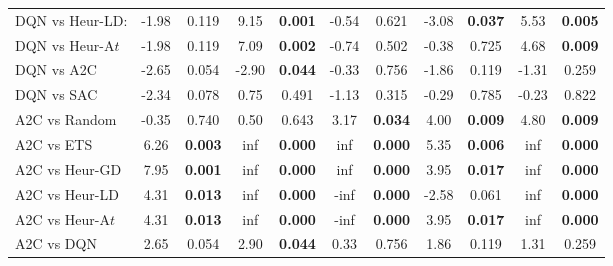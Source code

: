 \begin{tabular}{lcccccccccc}
	DQN vs Heur-LD:  & -1.98          & 0.119                  & 9.15           & \textbf{0.001}         & -0.54          & 0.621                  & -3.08          & \textbf{0.037}         & 5.53           & \textbf{0.005}         \\
	DQN vs Heur-A$t$ & -1.98          & 0.119                  & 7.09           & \textbf{0.002}         & -0.74          & 0.502                  & -0.38          & 0.725                  & 4.68           & \textbf{0.009}         \\
	DQN vs A2C       & -2.65          & 0.054                  & -2.90          & \textbf{0.044}         & -0.33          & 0.756                  & -1.86          & 0.119                  & -1.31          & 0.259                  \\
	DQN vs SAC       & -2.34          & 0.078                  & 0.75           & 0.491                  & -1.13          & 0.315                  & -0.29          & 0.785                  & -0.23          & 0.822                  \\
	\midrule 
	A2C vs Random    & -0.35          & 0.740                  & 0.50           & 0.643                  & 3.17           & \textbf{0.034}         & 4.00           & \textbf{0.009}         & 4.80           & \textbf{0.009}         \\
	A2C vs ETS       & 6.26           & \textbf{0.003}         & inf            & \textbf{0.000}         & inf            & \textbf{0.000}         & 5.35           & \textbf{0.006}         & inf            & \textbf{0.000}         \\
	A2C vs Heur-GD   & 7.95           & \textbf{0.001}         & inf            & \textbf{0.000}         & inf            & \textbf{0.000}         & 3.95           & \textbf{0.017}         & inf            & \textbf{0.000}         \\
	A2C vs Heur-LD   & 4.31           & \textbf{0.013}         & inf            & \textbf{0.000}         & -inf           & \textbf{0.000}         & -2.58          & 0.061                  & inf            & \textbf{0.000}         \\
	A2C vs Heur-A$t$ & 4.31           & \textbf{0.013}         & inf            & \textbf{0.000}         & -inf           & \textbf{0.000}         & 3.95           & \textbf{0.017}         & inf            & \textbf{0.000}         \\
	A2C vs DQN       & 2.65           & 0.054                  & 2.90           & \textbf{0.044}         & 0.33           & 0.756                  & 1.86           & 0.119                  & 1.31           & 0.259                  \\

\end{tabular}
